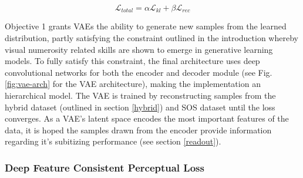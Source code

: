 \documentclass[twocolumn]{article}
\begin{document}
\[\mathcal{L}_{total} = \alpha\mathcal{L}_{kl} + \beta\mathcal{L}_{rec} \tag{1}\]

\noindent Objective 1 grants VAEs the ability to generate new samples
from the learned distribution, partly satisfying the constraint outlined
in the introduction whereby visual numerosity related skills are shown to emerge in
generative learning models. To fully satisfy this constraint, the final
architecture uses deep convolutional networks for both the encoder and decoder
module (see Fig. \ref{fig:vae-arch} for the VAE architecture), making the
implementation an hierarchical model. The VAE is trained by reconstructing samples from the hybrid dataset (outlined in section \ref{hybrid}) and SOS dataset until the loss converges. As a VAE's latent space
encodes the most important features of the data, it is hoped the samples
drawn from the encoder provide information regarding it's subitizing
performance (see section \ref{readout}). 

\hypertarget{deep-feature-consistent-perceptual-loss}{%
\subsubsection{Deep Feature Consistent Perceptual
Loss}\label{deep-feature-consistent-perceptual-loss}}
\end{document}
